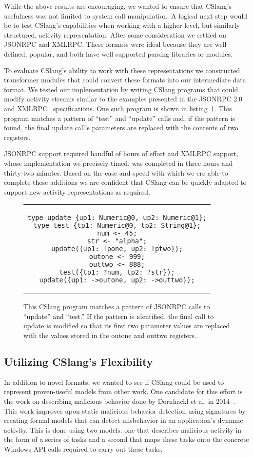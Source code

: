 While the above results are encouraging, we wanted to ensure that CSlang's
usefulness was not limited to system call manipulation.
A logical next step would be to test CSlang's capabilities when working
with a higher level, but similarly structured, activity representation.
After some consideration we settled on JSONRPC and XMLRPC.  These formats
were ideal because they are well defined, popular, and both have well
supported parsing libraries or modules.

To evaluate CSlang's ability to work with these representations we
constructed transformer modules that could convert these formats into our
intermediate data format.
We tested our implementation by writing CSlang programs that could modify
activity streams similar to the examples presented in the JSONRPC
2.0~\cite{jsonspec} and XMLRPC~\cite{xmlspec}
specifications.  One such program is shown in
listing~\ref{lst:JSONProgram}.  This program matches a pattern of ``test''
and ``update'' calls and, if the pattern is found, the final update call's
parameters are replaced with the contents of two registers.

JSONRPC support required handful of hours of effort and XMLRPC
support, whose implementation we precisely timed, was completed in three
hours and thirty-two minutes.  Based on the ease and speed with which we
ere able to complete these additions we are confident that CSlang can be
quickly adapted to support new activity representations as required.

\begin{figure}[H]
\centering
\begin{tabular}{c}
\begin{lstlisting}
type update {up1: Numeric@0, up2: Numeric@1};
type test {tp1: Numeric@0, tp2: String@1};
num <- 45;
str <- "alpha";
update({up1: !pone, up2: !ptwo});
outone <- 999;
outtwo <- 888;
test({tp1: ?num, tp2: ?str});
update({up1: ->outone, up2: ->outtwo});
\end{lstlisting}
\end{tabular}
\caption{This CSlang program matches a pattern of JSONRPC calls to
  ``update'' and ``test.''  If the pattern is identified, the final call to
  update is modified so that its first two parameter values are replaced
  with the values stored in the outone and outtwo registers.}
\label{lst:JSONProgram}
\end{figure}


\subsection{Utilizing CSlang's Flexibility}
In addition to novel formats, we wanted to see if CSlang could be used to
represent proven-useful models from other work.  One candidate for this
effort is the work on describing malicious behavior done by Dornhackl et
al. in 2014~\cite{Dornhackl2014}.  This work improves upon static malicious
behavior detection using signatures by creating formal models that can
detect misbehavior in an application's dynamic activity.  This is done
using two models: one that describes malicious activity in the form of a
series of tasks and a second that maps these tasks onto the concrete
Windows API calls required to carry out these tasks.

